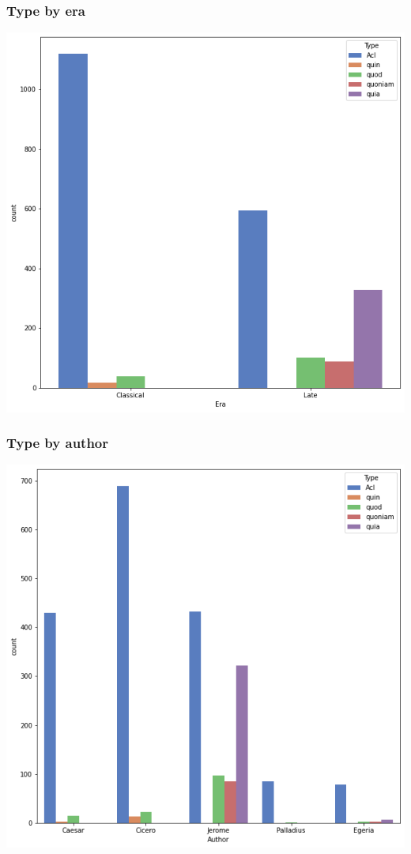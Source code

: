 \documentclass{beamer}
\begin{document}
\begin{frame}
\frametitle{Type by era}
\begin{center}
    \includegraphics[width=\textwidth,height=0.8\textheight,keepaspectratio]{graphs/type_by_era.png}
\end{center}
\end{frame}

\begin{frame}
\frametitle{Type by author}
\begin{center}
\includegraphics[width=\textwidth,height=0.8\textheight,keepaspectratio]{graphs/type_by_auth.png}
\end{center}
\end{frame}
\end{document}
